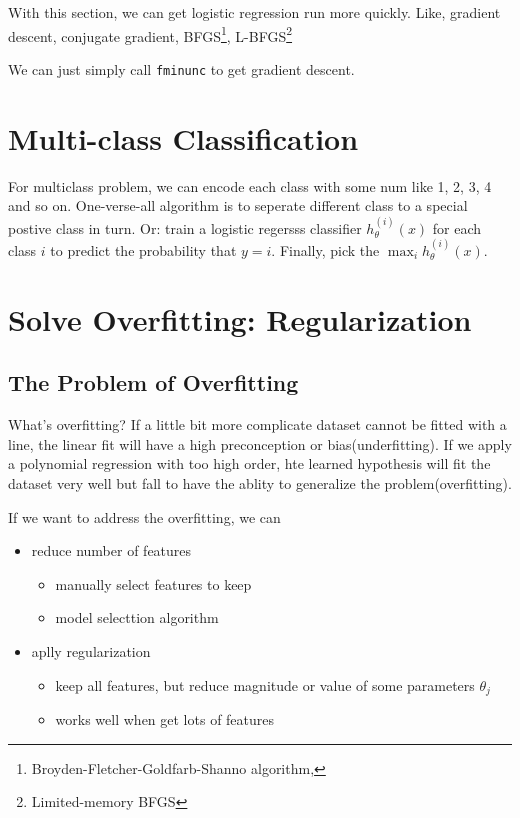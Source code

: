 \documentclass[black,simple]{../elegantbook}
\begin{document}
With this section, we can get logistic regression run more quickly. Like, gradient descent, conjugate gradient, BFGS\footnote{Broyden-Fletcher-Goldfarb-Shanno algorithm, }, L-BFGS\footnote{Limited-memory BFGS}

We can just simply call \lstinline{fminunc} to get gradient descent.


\section{Multi-class Classification}


For multiclass problem, we can encode each class with some num like 1, 2, 3, 4 and so on.
One-verse-all algorithm is to seperate different class to a special postive class in turn. Or: train a logistic regersss     classifier \(h_\theta^{(i)}(x)\) for each class \(i\) to predict the probability that \(y = i\). Finally, pick the \(\max_i h_\theta^{(i)}(x)\).

\section{Solve Overfitting: Regularization}

\subsection{The Problem of Overfitting}

What's overfitting? If a little bit more complicate dataset cannot be fitted with a line, the linear fit will have a high preconception or bias(underfitting). If we apply a polynomial regression with too high order, hte learned hypothesis will fit the dataset very well but fall to have the ablity to generalize the problem(overfitting).

If we want to address the overfitting, we can

\begin{itemize}
    \item reduce number of features
    \begin{itemize}
        \item manually select features to keep
        \item model selecttion algorithm
    \end{itemize}
    \item aplly regularization
    \begin{itemize}
        \item keep all features, but reduce magnitude or value of some parameters \(\theta_j\)
        \item works well when get lots of features
    \end{itemize}
\end{itemize}
\end{document}
